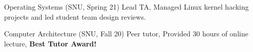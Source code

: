 

\begin{cvlist}

  \cvlistitem
    {Operating Systems (SNU, Spring 21)} %
    {Lead TA, Managed Linux kernel hacking projects and led student team design reviews.} %

  \cvlistitem
    {Computer Architecture (SNU, Fall 20)} %
    {Peer tutor, Provided 30 hours of online lecture, \textbf{Best Tutor Award!}} %

\end{cvlist}
